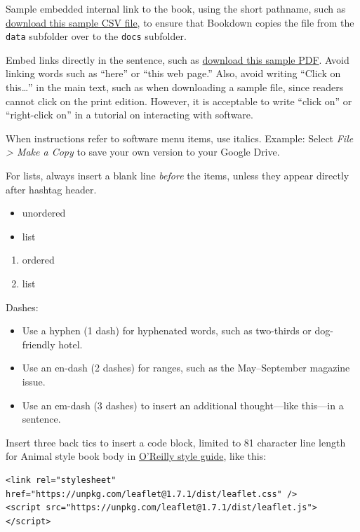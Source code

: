 \documentclass[
  english,
]{book}
\providecommand{\tightlist}{%
  \setlength{\itemsep}{0pt}\setlength{\parskip}{0pt}}
\begin{document}
Sample embedded internal link to the book, using the short pathname, such as \href{data/data.csv}{download this sample CSV file}, to ensure that Bookdown copies the file from the \texttt{data} subfolder over to the \texttt{docs} subfolder.

Embed links directly in the sentence, such as \href{data/ct-dph-covid-2020-05-31.pdf}{download this sample PDF}. Avoid linking words such as ``here'' or ``this web page.'' Also, avoid writing ``Click on this\ldots{}'' in the main text, such as when downloading a sample file, since readers cannot click on the print edition. However, it is acceptable to write ``click on'' or ``right-click on'' in a tutorial on interacting with software.

When instructions refer to software menu items, use italics. Example: Select \emph{File \textgreater{} Make a Copy} to save your own version to your Google Drive.

For lists, always insert a blank line \emph{before} the items, unless they appear directly after hashtag header.

\begin{itemize}
\tightlist
\item
  unordered
\item
  list
\end{itemize}

\begin{enumerate}
\def\labelenumi{\arabic{enumi}.}
\tightlist
\item
  ordered
\item
  list
\end{enumerate}

Dashes:

\begin{itemize}
\tightlist
\item
  Use a hyphen (1 dash) for hyphenated words, such as two-thirds or dog-friendly hotel.
\item
  Use an en-dash (2 dashes) for ranges, such as the May--September magazine issue.
\item
  Use an em-dash (3 dashes) to insert an additional thought---like this---in a sentence.
\end{itemize}

Insert three back tics to insert a code block, limited to 81 character line length for Animal style book body in \href{https://oreillymedia.github.io/production-resources/styleguide/\#line-length}{O'Reilly style guide}, like this:

\begin{verbatim}
<link rel="stylesheet" href="https://unpkg.com/leaflet@1.7.1/dist/leaflet.css" />
<script src="https://unpkg.com/leaflet@1.7.1/dist/leaflet.js"></script>
\end{verbatim}
\end{document}
